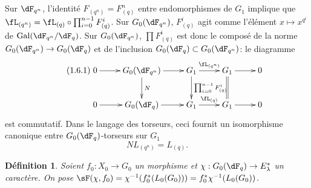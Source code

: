 \documentclass[oneside]{book}
\DeclareMathOperator{\gal}{Gal}
\theoremstyle{sga-source}
\theoremstyle{sga-source-dash}
\theoremstyle{sga-source-dotdash}
\theoremstyle{sga-source-number-note-dash}
\theoremstyle{sga-source-note-number-dotdash}
\theoremstyle{sga-source-example-dotdash}
\theoremstyle{sga-source-inline-number}
\theoremstyle{sga-source-bare-number}
\theoremstyle{sga-source}
\newtheorem{definition_}[subsection]{Définition}
\begin{document}
\subsection{}\label{VI:1-6}

Sur $\dF_{q^n}$, l'identité $F_{(q^n)}=F_{(q)}^n$ entre endomorphismes de 
$G_1$ implique que $\fL_{(q^n)}=\fL_{(q)}\circ \prod_{i=0}^{n-1} F_{(q)}^i$. 
Sur $G_0(\dF_{q^n})$, $F_{(q)}^i$ agit comme l'élément 
$x\mapsto x^{q^i}$ de $\gal(\dF_{q^n}/\dF_q)$. Sur $G_0(\dF_{q^n})$, 
$\prod F_{(q)}^i$ est donc le composé de la norme 
$G_0(\dF_{q^n})\to G_0(\dF_q)$ et de l'inclusion 
$G_0(\dF_q)\subset G_0(\dF_{q^n})$: le diagramme 
\begin{equation*}\tag{1.6.1}\label{VI:eq:1-6-1}
\xymatrix{
  0 \ar[r] 
    & G_0(\dF_{q^n}) \ar[r] \ar[d]^-N 
    & G_1 \ar[r]^-{\fL_{(q^n)}} \ar[d]^-{\prod_{i=0}^{n-1} F_{(q)}^i} 
    & G_1 \ar[r] \ar@{=}[d] 
    & 0 \\
  0 \ar[r] 
    & G_0(\dF_q) \ar[r] 
    & G_1 \ar[r]^-{\fL_{(q)}} 
    & G_1 \ar[r] 
    & 0
}
\end{equation*}
est commutatif. Dans le langage des torseurs, ceci fournit un isomorphisme 
canonique entre $G_0(\dF_q)$-torseurs sur $G_1$ 
\begin{equation*}\tag{1.6.2}\label{VI:eq:1-6-2}
  N L_{(q^n)} = L_{(q)} \text{.}
\end{equation*}





\begin{definition_}\label{VI:1-7}
Soient $f_0:X_0\to G_0$ un morphisme et 
$\chi:G_0(\dF_q)\to E_\lambda^\ast$ un caractère. On pose 
$\sF(\chi,f_0) = \chi^{-1}(f_0^\ast (L_0(G_0))) = f_0^\ast\chi^{-1}(L_0(G_0))$. 
\end{definition_}
\end{document}

